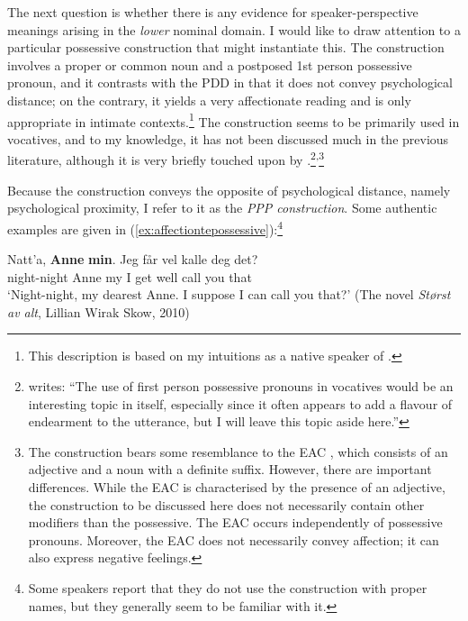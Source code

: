 \documentclass[output=paper]{langsci/langscibook}
\begin{document}
The next question is whether there is any evidence for
speaker-perspective meanings arising  in the
\emph{lower} nominal domain.  I would like to draw attention to a particular
possessive construction that might instantiate this.  The construction
involves a proper or common noun  and a postposed 1st person possessive
pronoun, and it contrasts with  the \gls{PDD} in  that it does not convey psychological distance; on
the contrary, it yields a very affectionate reading and is only appropriate in
intimate contexts.\footnote{This description is based on my intuitions as a
native speaker of .} The construction seems to be primarily used
in vocatives, and to my knowledge, it has not been discussed much in the
previous literature, although it is very briefly touched upon by
\citet{julien2016predicationalvocatives}.\footnote{\citet[90]{julien2016predicationalvocatives}
    writes: ``The use of first person possessive pronouns in vocatives would be
    an interesting topic in itself, especially since it often appears to add a
    flavour of endearment to the utterance, but I will leave this topic aside
    here.''}\textsuperscript{,}\footnote{The construction bears some
    resemblance to the \gls{EAC}
    \citep[294ff]{halmoy2016nominal}, which consists of an adjective and a noun
    with a definite suffix.  However, there are important differences. While
    the \gls{EAC} is characterised by the presence of an adjective, the
    construction to be discussed here does not necessarily contain other
    modifiers than the possessive. The \gls{EAC} occurs independently of
    possessive pronouns. Moreover, the \gls{EAC} does not necessarily convey
affection; it can also express negative feelings.}

Because the construction  conveys the opposite	 of psychological distance,
namely  psychological proximity, I refer to it as the \emph{\gls{PPP}
    construction}. Some authentic examples are given in
    (\ref{ex:affectiontepossessive}):\footnote{Some speakers report that they
    do not use the construction with proper names, but they generally seem to
be familiar with it.}

\ea\label{ex:affectiontepossessive}
	\ea
		\gll Natt'a, \textbf{Anne} \textbf{min}. Jeg f\aa{}r vel kalle deg det?\\
		night-night Anne my I get well call you that\\
		\glt `Night-night, my dearest Anne. I suppose I can call you that?' (The novel \emph{St\o{}rst av alt}, Lillian Wirak Skow, 2010)
\end{document}
